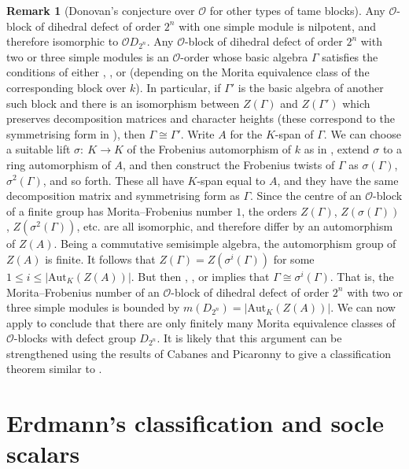 \documentclass{amsart}
\theoremstyle{plain}\newtheorem{Theorem}{Theorem}[section]
\theoremstyle{plain}\newtheorem{Conjecture}[Theorem]{Conjecture}
\theoremstyle{plain}\newtheorem{Corollary}[Theorem]{Corollary}
\theoremstyle{plain}\newtheorem{Lemma}[Theorem]{Lemma}
\theoremstyle{plain}\newtheorem{Proposition}[Theorem]{Proposition}
\theoremstyle{definition}\newtheorem{Definition}[Theorem]{Definition}
\theoremstyle{definition}\newtheorem{Example}[Theorem]{Example}
\theoremstyle{definition}\newtheorem{Examples}[Theorem]{Examples}
\theoremstyle{definition}\newtheorem{Exercise}[Theorem]{Exercise}
\theoremstyle{definition}\newtheorem{Notation}[Theorem]{Notation}
\theoremstyle{definition}\newtheorem{Remark}[Theorem]{Remark}
\theoremstyle{definition}\newtheorem{Remarks}[Theorem]{Remarks}
\def\CO{{\mathcal{O}}}    \def\OPE{{\mathcal{O}(P\rtimes E)}}
\def\Aut{\mathrm{Aut}}               \def\tenk{\otimes_k}
\numberwithin{equation}{section}
\begin{document}
\begin{Remark}[Donovan's conjecture over $\CO$ for other types of tame blocks]
Any $\CO$-block of dihedral defect of order $2^n$ with one simple module is nilpotent, and therefore isomorphic to $\CO D_{2^n}$. Any $\CO$-block of dihedral defect of order $2^n$ with two or three simple modules is an $\CO$-order whose basic algebra $\Gamma$ satisfies the conditions of either \cite[Thm.~6.8]{Eisele12}, \cite[Cor.~6.10]{Eisele12}, \cite[Thm.~4.15]{EiseleDiss} or \cite[Cor.~4.16]{EiseleDiss}  (depending on the Morita equivalence class of the corresponding block over $k$). In particular, if $\Gamma'$ is the basic algebra of another such block and there is an isomorphism between $Z(\Gamma)$ and $Z(\Gamma')$ which preserves decomposition matrices and character heights (these correspond to the symmetrising form in \cite{Eisele12}), then $\Gamma\cong \Gamma'$. Write $A$ for the $K$-span of $\Gamma$. We can choose a suitable lift $\sigma:\ K \longrightarrow K$ of the Frobenius automorphism of $k$ as in \cite{eel20}, extend $\sigma$ to a ring automorphism of $A$, and then construct the Frobenius twists of $\Gamma$ as $\sigma(\Gamma)$, $\sigma^2(\Gamma)$, and so forth. These all have $K$-span equal to $A$, and they have the same decomposition matrix and symmetrising form as $\Gamma$. Since the centre of an $\CO$-block of a finite group has Morita--Frobenius number $1$, the orders $Z(\Gamma)$, $Z(\sigma(\Gamma))$, $Z(\sigma^2(\Gamma))$, etc. are all isomorphic, and therefore differ by an automorphism of $Z(A)$. Being a commutative semisimple algebra, the automorphism group of $Z(A)$ is finite. 
It follows that $Z(\Gamma)=Z(\sigma^i(\Gamma))$ for some $1\leq i\leq |\Aut_K(Z(A))|$. But then \cite[Thm.~6.8]{Eisele12}, \cite[Cor.~6.10]{Eisele12}, \cite[Thm.~4.15]{EiseleDiss} or \cite[Cor.~4.16]{EiseleDiss} implies that $\Gamma \cong \sigma^i(\Gamma)$. That is, the Morita--Frobenius number of an $\CO$-block of dihedral defect of order $2^n$ with two or three simple modules is bounded by $m(D_{2^n})=|\Aut_K(Z(A))|$. We can now apply  to conclude that there are only finitely many Morita equivalence classes of $\CO$-blocks with defect group $D_{2^n}$. It is likely that this argument can be strengthened  using the results of Cabanes and Picaronny \cite{CabanesPicaronny} to give a classification theorem similar to \cite[Thm.~1.1]{Eisele16}.
\end{Remark}


\section{Erdmann's classification and socle scalars}
\label{socle scalars}
\end{document}
